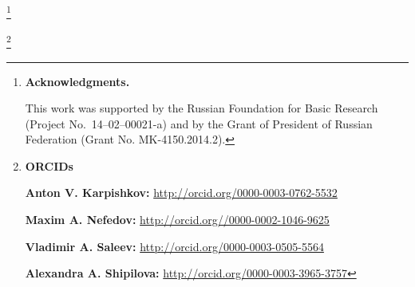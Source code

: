 \RuDate





\newpage



\makeentitle







\thanks{

\textbf{Acknowledgments.}

This work was supported by the Russian Foundation for Basic Research (Project No.~14--02--00021-a) and by the Grant of President of Russian Federation (Grant No. MK-4150.2014.2).

}





\thanks{{\bf ORCIDs}



{\bf Anton V. Karpishkov:} \url{http://orcid.org/0000-0003-0762-5532}



{\bf Maxim A. Nefedov:} \url{http://orcid.org//0000-0002-1046-9625}



{\bf Vladimir A. Saleev:} \url{http://orcid.org/0000-0003-0505-5564}



{\bf Alexandra A. Shipilova:} \url{http://orcid.org/0000-0003-3965-3757}



}





\EngRef







